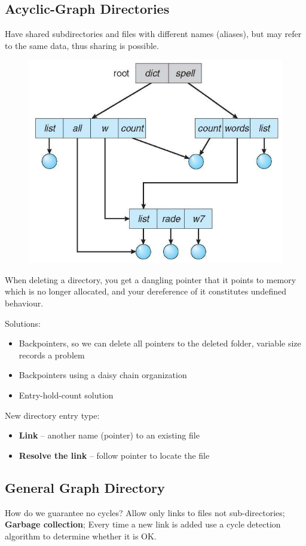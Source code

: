 \subsection{Acyclic-Graph Directories}

Have shared subdirectories and files with different names (aliases), but may refer to the same data, thus sharing is possible.

\begin{figure}[h!]
    \centering
    \includegraphics[width=0.5\linewidth]{img/fdbg.png}
\end{figure}

When deleting a directory, you get a dangling pointer that it points to
memory which is no longer allocated, and your dereference of it
constitutes undefined behaviour.

Solutions:

\begin{itemize}
    \item Backpointers, so we can delete all pointers to the deleted folder, variable size records a problem
    \item Backpointers using a daisy chain organization
    \item Entry-hold-count solution
\end{itemize}

New directory entry type:

\begin{itemize}
    \item[] \textbf{Link} – another name (pointer) to an existing file
    \item[] \textbf{Resolve the link} – follow pointer to locate the file
\end{itemize}

\newpage
\subsection{General Graph Directory}

How do we guarantee no cycles? Allow only links to files not sub-directories; \textbf{Garbage collection}; Every time a new link is added use a cycle detection algorithm to
determine whether it is OK.

